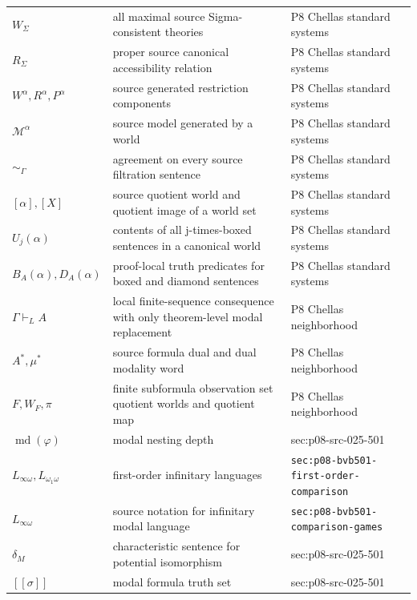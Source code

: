 \begin{longtable}{@{}p{}p{}p{}@{}}
\(W_\Sigma\) & all maximal source Sigma-consistent theories & P8 Chellas standard systems \\
\(R_\Sigma\) & proper source canonical accessibility relation & P8 Chellas standard systems \\
\(W^\alpha,\allowbreak R^\alpha,\allowbreak P^\alpha\) & source generated restriction components & P8 Chellas standard systems \\
\(\mathcal M^\alpha\) & source model generated by a world & P8 Chellas standard systems \\
\(\sim_\Gamma\) & agreement on every source filtration sentence & P8 Chellas standard systems \\
\([\alpha],\allowbreak [X]\) & source quotient world and quotient image of a world set & P8 Chellas standard systems \\
\(U_j(\alpha)\) & contents of all j-times-boxed sentences in a canonical world & P8 Chellas standard systems \\
\(B_A(\alpha),\allowbreak D_A(\alpha)\) & proof-local truth predicates for boxed and diamond sentences & P8 Chellas standard systems \\
\(\Gamma\vdash_L A\) & local finite-sequence consequence with only theorem-level modal replacement & P8 Chellas neighborhood \\
\(A^*,\allowbreak \mu^*\) & source formula dual and dual modality word & P8 Chellas neighborhood \\
\(F,\allowbreak W_F,\allowbreak \pi\) & finite subformula observation set quotient worlds and quotient map & P8 Chellas neighborhood \\
\(\operatorname{md}(\varphi)\) & modal nesting depth & sec:\allowbreak{}p08-\allowbreak{}src-\allowbreak{}025-\allowbreak{}501 \\
\(L_{\infty\omega},\allowbreak L_{\omega_1\omega}\) & first-order infinitary languages & \texttt{sec:\allowbreak{}p08-\allowbreak{}bvb501-\allowbreak{}first-\allowbreak{}order-\allowbreak{}comparison} \\
\(L_{\infty\omega}\) & source notation for infinitary modal language & \texttt{sec:\allowbreak{}p08-\allowbreak{}bvb501-\allowbreak{}comparison-\allowbreak{}games} \\
\(\delta_M\) & characteristic sentence for potential isomorphism & sec:\allowbreak{}p08-\allowbreak{}src-\allowbreak{}025-\allowbreak{}501 \\
\([\![\sigma]\!]\) & modal formula truth set & sec:\allowbreak{}p08-\allowbreak{}src-\allowbreak{}025-\allowbreak{}501 \\

\end{longtable}
